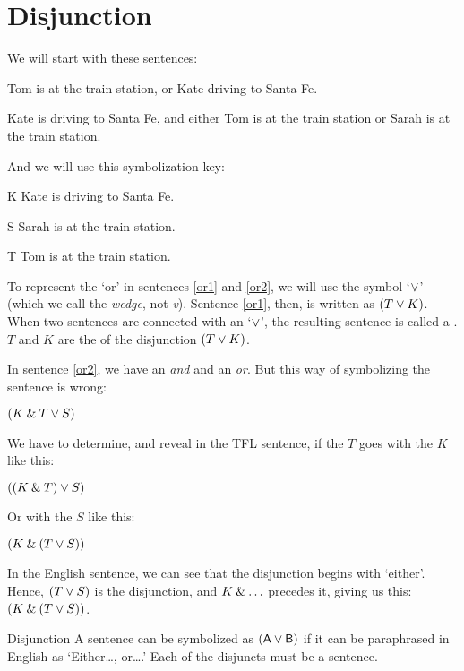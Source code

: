 \section{Disjunction}
\label{s:ConnectiveDisjunction}

We will start with these sentences:
	\begin{earg}
		\item[\ex{or1}] Tom is at the train station, or Kate driving to Santa Fe.
		\item[\ex{or2}] Kate is driving to Santa Fe, and either Tom is at the train station or Sarah is at the train station. 
	\end{earg}
And we will use this symbolization key:
	\begin{ekey}
		\item[K] Kate is driving to Santa Fe.
		\item[S] Sarah is at the train station.
		\item[T] Tom is at the train station.
	\end{ekey}
To represent the `or' in sentences \ref{or1} and \ref{or2}, we will use the symbol `$\vee$' (which we call the \textit{wedge}, not \textit{v}). Sentence \ref{or1}, then, is written as $(T \vee K)$. When two sentences are connected with an `$\vee$', the resulting sentence is called a . $T$ and $K$ are the  of the disjunction $(T \vee K)$.

In sentence \ref{or2}, we have an \textit{and} and an \textit{or}. But this way of symbolizing the sentence is wrong:
	\begin{earg}
		\item[] $(K \mathbin{\&} T \vee S)$ 
	\end{earg}
We have to determine, and reveal in the TFL sentence, if the $T$ goes with the $K$ like this:
	\begin{earg}
		\item[] $((K \mathbin{\&} T) \vee S)$ 
	\end{earg}
Or with the $S$ like this:
	\begin{earg}
		\item[] $(K \mathbin{\&} (T \vee S))$ 
	\end{earg}
In the English sentence, we can see that the disjunction begins with `either'. Hence, $(T \vee S)$ is the disjunction, and $K \mathbin{\&} \ldots$ precedes it, giving us this: $(K \mathbin{\&} (T \vee S))$.


\begin{factboxy}{Disjunction}
A sentence can be symbolized as $(\mathsf{A}\vee\mathsf{B})$ if it can be paraphrased in English as `Either\ldots, or\ldots.' Each of the disjuncts must be a sentence.
\end{factboxy}

